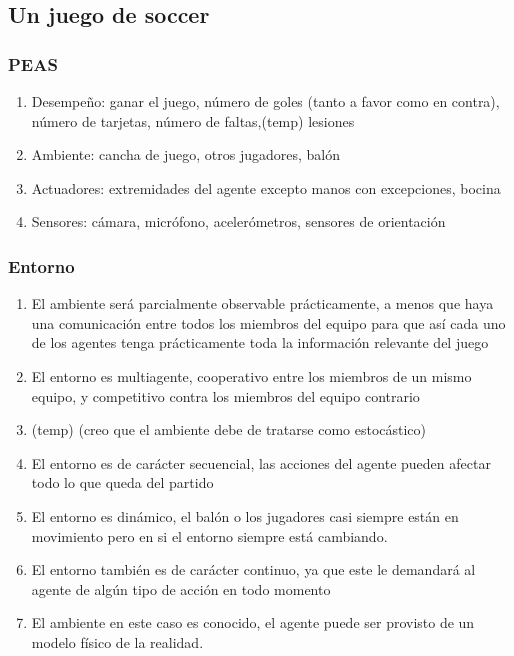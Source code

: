 \documentclass{article}
\begin{document}
        \subsection{Un juego de soccer}
            \subsubsection{PEAS}
                \begin{enumerate}
                    \item Desempeño: ganar el juego, número de goles (tanto a favor como en contra), número de tarjetas, número de faltas,(temp) lesiones
                    \item Ambiente: cancha de juego, otros jugadores, balón
                    \item Actuadores: extremidades del agente excepto manos con excepciones, bocina
                    \item Sensores: cámara, micrófono, acelerómetros, sensores de orientación
                \end{enumerate}

            \subsubsection{Entorno}
                \begin{enumerate}
                    \item El ambiente será parcialmente observable prácticamente, a menos que haya una comunicación entre todos los miembros del equipo para que así cada uno de los agentes tenga prácticamente toda la información relevante del juego
                    \item El entorno es multiagente, cooperativo entre los miembros de un mismo equipo, y competitivo contra los miembros del equipo contrario
                    \item (temp) (creo que el ambiente debe de tratarse como estocástico)
                    \item El entorno es de carácter secuencial, las acciones del agente pueden afectar todo lo que queda del partido
                    \item El entorno es dinámico, el balón o los jugadores casi siempre están en movimiento pero en si el entorno siempre está cambiando. 
                    \item El entorno también es de carácter continuo, ya que este le demandará al agente de algún tipo de acción en todo momento
                    \item El ambiente en este caso es conocido, el agente puede ser provisto de un modelo  físico de la realidad.
                \end{enumerate}
\end{document}
